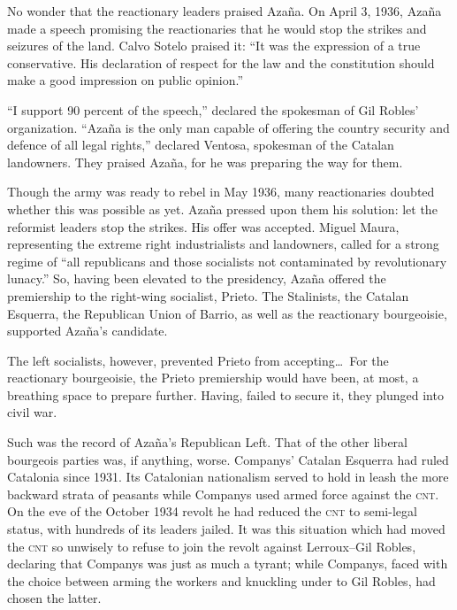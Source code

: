 No wonder that the reactionary leaders praised Azaña. On April 3, 1936, Azaña made a speech promising the reactionaries that he would stop the strikes and seizures of the land. Calvo Sotelo praised it: ``It was the expression of a true conservative. His declaration of respect for the law and the constitution should make a good impression on public opinion.''

``I support 90 percent of the speech,'' declared the spokesman of Gil Robles’ organization. ``Azaña is the only man capable of offering the country security and defence of all legal rights,'' declared Ventosa, spokesman of the Catalan landowners. They praised Azaña, for he was preparing the way for them.

Though the army was ready to rebel in May 1936, many reactionaries doubted whether this was possible as yet. Azaña pressed upon them his solution: let the reformist leaders stop the strikes. His offer was accepted. Miguel Maura, representing the extreme right industrialists and landowners, called for a strong regime of ``all republicans and those socialists not contaminated by revolutionary lunacy.'' So, having been elevated to the presidency, Azaña offered the premiership to the right-wing socialist, Prieto. The Stalinists, the Catalan Esquerra{\indexEsquerra}, the Republican Union of Barrio, as well as the reactionary bourgeoisie, supported Azaña’s candidate.

The left socialists, however, prevented Prieto{\indexIPrieto} from accepting\ldots\ For the reactionary bourgeoisie, the Prieto premiership would have been, at most, a breathing space to prepare further. Having, failed to secure it, they plunged into civil war.

Such was the record of Azaña’s Republican Left. That of the other liberal bourgeois parties was, if anything, worse. Companys’ Catalan Esquerra had ruled Catalonia since 1931.{\indexLCompanys} Its Catalonian nationalism served to hold in leash the more backward strata of peasants while Companys used armed force against the \textsc{cnt}. On the eve of the October 1934 revolt he had reduced the \textsc{cnt} to semi-legal status, with hundreds of its leaders jailed. It was this situation which had moved the \textsc{cnt} so unwisely to refuse to join the revolt against Lerroux--Gil Robles, declaring that Companys was just as much a tyrant; while Companys, faced with the choice between arming the workers and knuckling under to Gil Robles, had chosen the latter.

